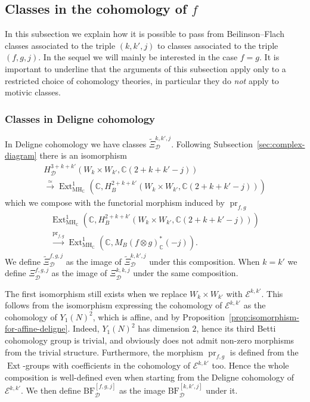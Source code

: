\documentclass[11pt, a4paper, reqno]{amsart}
\theoremstyle{definition}
\theoremstyle{plain}
\theoremstyle{remark}
\DeclareMathOperator{\Ext}{Ext}
\DeclareMathOperator{\pr}{pr}
\newcommand{\numberset}{\mathbb}
\newcommand{\C}{\numberset{C}}
\newcommand{\Ell}{\mathcal{E}}
\newcommand{\BF}{\mathrm{BF}}
\newcommand{\lcBF}{\widetilde{\Xi}}
\newcommand{\cBF}{\Xi}
\newcommand{\MH}{\mathrm{MH}}
\newcommand{\del}{\mathcal{D}}
\begin{document}
\subsection{Classes in the cohomology of \texorpdfstring{$f$}{f}}
In this subsection we explain how it is possible to pass from Beilinson--Flach classes associated to the triple $(k,k',j)$ to classes associated to the triple $(f,g,j)$. In the sequel we will mainly be interested in the case $f=g$. It is important to underline that the arguments of this subsection apply only to a restricted choice of cohomology theories, in particular they do \emph{not} apply to motivic classes.

\subsubsection{Classes in Deligne cohomology}
In Deligne cohomology we have classes $\lcBF^{k,k',j}_{\del}$. Following Subsection~\ref{sec:complex-diagram} there is an isomorphism
\begin{multline*}
    H^{3+k+k'}_{\del}(W_k \times W_{k'}, \C(2+k+k'-j)) \\
    \xrightarrow{\simeq} \Ext^1_{\MH_{\C}}(\C, H^{2+k+k'}_B(W_k\times W_{k'}, \C(2+k+k'-j)))
\end{multline*}
which we compose with the functorial morphism induced by $\pr_{f,g}$
\begin{multline*}
    \Ext^1_{\MH_{\C}}(\C, H^{2+k+k'}_B(W_k\times W_{k'},\C(2+k+k'-j))) \\
    \xrightarrow{\pr_{f,g}} \Ext^1_{\MH_{\C}}(\C, M_B(f\otimes g)_{\C}^*(-j)).
\end{multline*}
We define $\lcBF^{f,g,j}_{\del}$ as the image of $\lcBF^{k,k',j}_{\del}$ under this composition. When $k=k'$ we define $\cBF^{f,g,j}_{\del}$ as the image of $\cBF^{k,k,j}_{\del}$ under the same composition.

The first isomorphism still exists when we replace $W_k\times W_{k'}$ with $\Ell^{k, k'}$. This follows from the isomorphism expressing the cohomology of $\Ell^{k, k'}$ as the cohomology of $Y_1(N)^2$, which is affine, and by Proposition~\ref{prop:isomorphism-for-affine-deligne}. Indeed, $Y_1(N)^2$ has dimension $2$, hence its third Betti cohomology group is trivial, and obviously does not admit non-zero morphisms from the trivial structure. Furthermore, the morphism $\pr_{f,g}$ is defined from the $\Ext$-groups with coefficients in the cohomology of $\Ell^{k, k'}$ too. Hence the whole composition is well-defined even when starting from the Deligne cohomology of $\Ell^{k, k'}$. We then define $\BF^{[f,g,j]}_{\del}$ as the image $\BF^{[k,k',j]}_{\del}$ under it.
\end{document}
